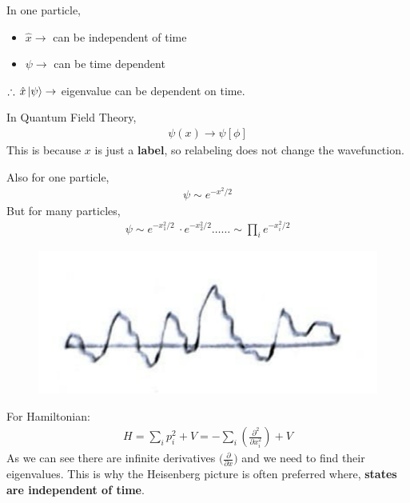 \documentclass[14pt]{article} %
\begin{document}
In one particle,
\begin{itemize}
    \item \( \hat{x} \to \) can be independent of time
    \item \( \psi \to \) can be time dependent
\end{itemize}
$\therefore \, \hat{x} \ket{\psi} \to$ eigenvalue can be dependent on time.
\begin{tcolorbox}
In Quantum Field Theory, 
\begin{align*}
\psi (x) \to \psi [\phi]
\end{align*}
This is because $x$ is just a \textbf{label}, so relabeling does not change the wavefunction.
\end{tcolorbox}
\noindent
Also for one particle,
\begin{align*}\psi \sim e^{-x^2/2}\end{align*}
But for many particles,
\begin{align*}\psi \sim e^{-x_1^2/2} ~\cdot e^{-x_2^2/2} \dots \dotsc \sim \prod_i e^{-x_i^2/2} \end{align*}
\begin{figure}[H]
    \centering
    \includegraphics[width=0.4\linewidth]{figures/C10_3.jpeg}
    \caption*{}
\end{figure}
For Hamiltonian:
\begin{align*}
H = \sum_i p_i^2 + V = -\sum_i \left(\frac{\partial^2}{\partial x_i^2}\right) + V
\end{align*}
As we can see there are infinite derivatives $\big(\frac{\partial}{\partial x}\big)$ and we need to find their eigenvalues. This is why the Heisenberg picture is often preferred where, \textbf{states are independent of time}. 
\end{document}
